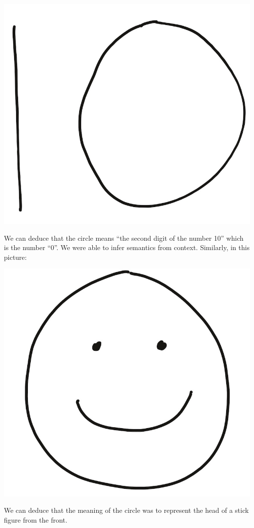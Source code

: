 \documentclass[
]{article}
\begin{document}
\includegraphics{ten.jpg}

We can deduce that the circle means ``the second digit of the number
10'' which is the number ``0''. We were able to infer semantics from
context. Similarly, in this picture:

\includegraphics{Smiley smol.jpeg}

We can deduce that the meaning of the circle was to represent the head
of a stick figure from the front.
\end{document}
